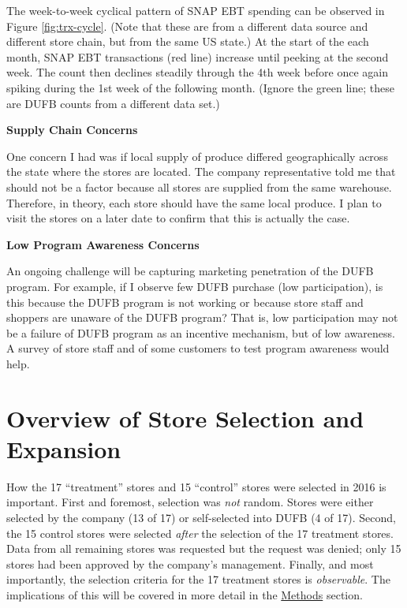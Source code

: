 \documentclass[12pt,letterpaperpaper,]{book}
\begin{document}
The week-to-week cyclical pattern of SNAP EBT spending can be observed
in Figure \ref{fig:trx-cycle}. (Note that these are from a different
data source and different store chain, but from the same US state.) At
the start of the each month, SNAP EBT transactions (red line) increase
until peeking at the second week. The count then declines steadily
through the 4th week before once again spiking during the 1st week of
the following month. (Ignore the green line; these are DUFB counts from
a different data set.)

\textbf{Supply Chain Concerns}

One concern I had was if local supply of produce differed geographically
across the state where the stores are located. The company
representative told me that should not be a factor because all stores
are supplied from the same warehouse. Therefore, in theory, each store
should have the same local produce. I plan to visit the stores on a
later date to confirm that this is actually the case.

\textbf{Low Program Awareness Concerns}

An ongoing challenge will be capturing marketing penetration of the DUFB
program. For example, if I observe few DUFB purchase (low
participation), is this because the DUFB program is not working or
because store staff and shoppers are unaware of the DUFB program? That
is, low participation may not be a failure of DUFB program as an
incentive mechanism, but of low awareness. A survey of store staff and
of some customers to test program awareness would help.

\hypertarget{store-selection-1}{\section*{Overview of Store Selection
and Expansion}\label{store-selection-1}}

How the 17 ``treatment'' stores and 15 ``control'' stores were selected
in 2016 is important. First and foremost, selection was \emph{not}
random. Stores were either selected by the company (13 of 17) or
self-selected into DUFB (4 of 17). Second, the 15 control stores were
selected \emph{after} the selection of the 17 treatment stores. Data
from all remaining stores was requested but the request was denied; only
15 stores had been approved by the company's management. Finally, and
most importantly, the selection criteria for the 17 treatment stores is
\emph{observable}. The implications of this will be covered in more
detail in the \protect\hyperlink{methods}{Methods} section.
\end{document}
